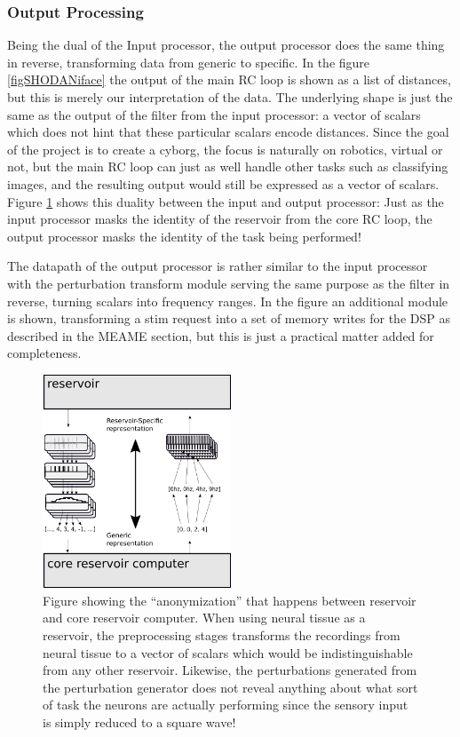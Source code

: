 \subsubsection{Output Processing}
Being the dual of the Input processor, the output processor does the same thing
in reverse, transforming data from generic to specific.
In the figure \ref{figSHODANiface} the output of the main RC loop is shown as a
list of distances, but this is merely our interpretation of the data.
The underlying shape is just the same as the output of the filter from the input
processor: a vector of scalars which does not hint that these particular scalars
encode distances.
Since the goal of the project is to create a cyborg, the focus is naturally on
robotics, virtual or not, but the main RC loop can just as well handle other
tasks such as classifying images, and the resulting output would still be
expressed as a vector of scalars.
Figure \ref{figGenericSpecific} shows this duality between the input and output
processor: Just as the input processor masks the identity of the reservoir from
the core RC loop, the output processor masks the identity of the task being
performed!\par
The datapath of the output processor is rather similar to the input processor
with the perturbation transform module serving the same purpose as the filter in
reverse, turning scalars into frequency ranges.
In the figure an additional module is shown, transforming a stim request into a
set of memory writes for the DSP as described in the MEAME section, but this is
just a practical matter added for completeness.
\begin{figure}[h!]
  \centering
  \includegraphics[width=0.5\textwidth]{fig/genericSpecific.png}
  \caption[Anonymization of data between reservoir and reservoir computer]{
    Figure showing the ``anonymization'' that happens between reservoir and core
    reservoir computer.
    When using neural tissue as a reservoir, the preprocessing stages transforms
    the recordings from neural tissue to a vector of scalars which would be
    indistinguishable from any other reservoir.
    Likewise, the perturbations generated from the perturbation generator does
    not reveal anything about what sort of task the neurons are actually
    performing since the sensory input is simply reduced to a square wave!
  }
  \label{figGenericSpecific}
\end{figure}
